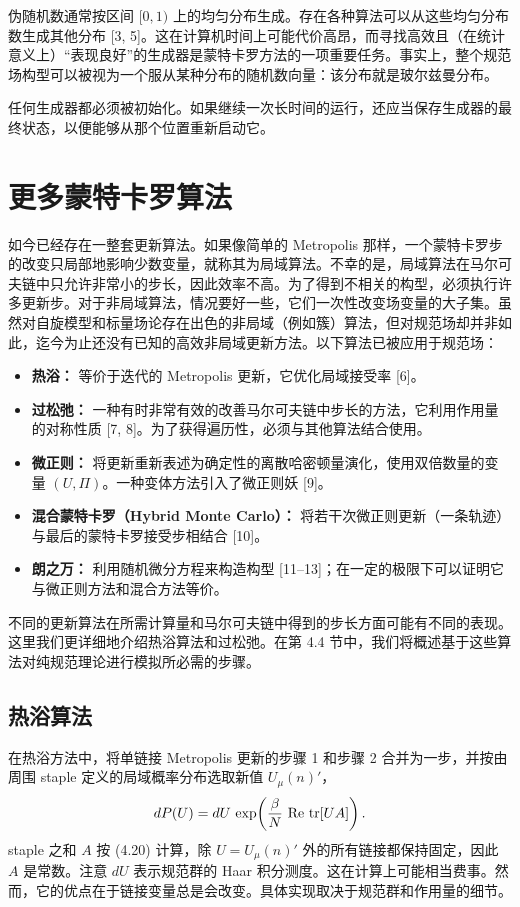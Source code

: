 伪随机数通常按区间 $[0,1)$ 上的均匀分布生成。存在各种算法可以从这些均匀分布数生成其他分布 [3, 5]。这在计算机时间上可能代价高昂，而寻找高效且（在统计意义上）“表现良好”的生成器是蒙特卡罗方法的一项重要任务。事实上，整个规范场构型可以被视为一个服从某种分布的随机数向量：该分布就是玻尔兹曼分布。

任何生成器都必须被初始化。如果继续一次长时间的运行，还应当保存生成器的最终状态，以便能够从那个位置重新启动它。

\section{更多蒙特卡罗算法}

如今已经存在一整套更新算法。如果像简单的 Metropolis 那样，一个蒙特卡罗步的改变只局部地影响少数变量，就称其为局域算法。不幸的是，局域算法在马尔可夫链中只允许非常小的步长，因此效率不高。为了得到不相关的构型，必须执行许多更新步。对于非局域算法，情况要好一些，它们一次性改变场变量的大子集。虽然对自旋模型和标量场论存在出色的非局域（例如簇）算法，但对规范场却并非如此，迄今为止还没有已知的高效非局域更新方法。以下算法已被应用于规范场：

\begin{itemize}
  \item \textbf{热浴：} 等价于迭代的 Metropolis 更新，它优化局域接受率 [6]。
  \item \textbf{过松弛：} 一种有时非常有效的改善马尔可夫链中步长的方法，它利用作用量的对称性质 [7, 8]。为了获得遍历性，必须与其他算法结合使用。
  \item \textbf{微正则：} 将更新重新表述为确定性的离散哈密顿量演化，使用双倍数量的变量 $(U, \Pi)$。一种变体方法引入了微正则妖 [9]。
  \item \textbf{混合蒙特卡罗（Hybrid Monte Carlo）：} 将若干次微正则更新（一条轨迹）与最后的蒙特卡罗接受步相结合 [10]。
  \item \textbf{朗之万：} 利用随机微分方程来构造构型 [11--13]；在一定的极限下可以证明它与微正则方法和混合方法等价。
\end{itemize}

不同的更新算法在所需计算量和马尔可夫链中得到的步长方面可能有不同的表现。这里我们更详细地介绍热浴算法和过松弛。在第 4.4 节中，我们将概述基于这些算法对纯规范理论进行模拟所必需的步骤。

\subsection{热浴算法}

在热浴方法中，将单链接 Metropolis 更新的步骤 1 和步骤 2 合并为一步，并按由周围 staple 定义的局域概率分布选取新值 $U_\mu(n)'$，
\begin{equation}
  dP(U) = dU\,\exp\!\left(\frac{\beta}{N}\,\operatorname{Re}\,\operatorname{tr}[U A]\right).
\end{equation}
staple 之和 $A$ 按 (4.20) 计算，除 $U = U_\mu(n)'$ 外的所有链接都保持固定，因此 $A$ 是常数。注意 $dU$ 表示规范群的 Haar 积分测度。这在计算上可能相当费事。然而，它的优点在于链接变量总是会改变。具体实现取决于规范群和作用量的细节。

